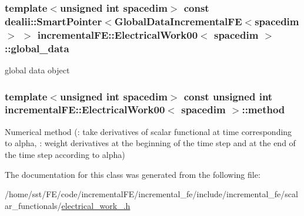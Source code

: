\subsubsection[{\texorpdfstring{global\+\_\+data}{global_data}}]{\setlength{\rightskip}{0pt plus 5cm}template$<$unsigned int spacedim$>$ const dealii\+::\+Smart\+Pointer$<${\bf Global\+Data\+Incremental\+FE}$<$spacedim$>$ $>$ {\bf incremental\+F\+E\+::\+Electrical\+Work00}$<$ spacedim $>$\+::global\+\_\+data\hspace{0.3cm}{\ttfamily [private]}}\hypertarget{classincremental_f_e_1_1_electrical_work00_aa265094f77f4b0cf74ebb25f6b6bdc9f}{}\label{classincremental_f_e_1_1_electrical_work00_aa265094f77f4b0cf74ebb25f6b6bdc9f}
global data object 
\subsubsection[{\texorpdfstring{method}{method}}]{\setlength{\rightskip}{0pt plus 5cm}template$<$unsigned int spacedim$>$ const unsigned int {\bf incremental\+F\+E\+::\+Electrical\+Work00}$<$ spacedim $>$\+::method\hspace{0.3cm}{\ttfamily [private]}}\hypertarget{classincremental_f_e_1_1_electrical_work00_a6730746f75d7d3ebae632da3e7fd68d5}{}\label{classincremental_f_e_1_1_electrical_work00_a6730746f75d7d3ebae632da3e7fd68d5}
Numerical method ({}\+: take derivatives of scalar functional at time corresponding to {\ttfamily alpha}, {}\+: weight derivatives at the beginning of the time step and at the end of the time step according to {\ttfamily alpha}) 

The documentation for this class was generated from the following file\+:\begin{DoxyCompactItemize}
\item 
/home/sst/\+F\+E/code/incremental\+F\+E/incremental\+\_\+fe/include/incremental\+\_\+fe/scalar\+\_\+functionals/\hyperlink{electrical__work__00_8h}{electrical\+\_\+work\+\_.\+h}\end{DoxyCompactItemize}
